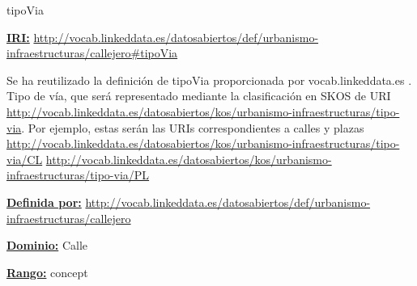 \begin{mybox}{tipoVia}
\begin{flushleft}
\underline{\textbf{IRI:}}
\url{http://vocab.linkeddata.es/datosabiertos/def/urbanismo-infraestructuras/callejero#tipoVia}
\newline

Se ha reutilizado la definición de tipoVia proporcionada por vocab.linkeddata.es \cite{datoabiertos_tipoVia}.
Tipo de vía, que será representado mediante la clasificación en SKOS de URI \url{http://vocab.linkeddata.es/datosabiertos/kos/urbanismo-infraestructuras/tipo-via}. Por ejemplo, estas serán las URIs correspondientes a calles y plazas \url{http://vocab.linkeddata.es/datosabiertos/kos/urbanismo-infraestructuras/tipo-via/CL} \url{http://vocab.linkeddata.es/datosabiertos/kos/urbanismo-infraestructuras/tipo-via/PL}
\newline

\underline{\textbf{Definida por:}}
\url{http://vocab.linkeddata.es/datosabiertos/def/urbanismo-infraestructuras/callejero}
\newline

\underline{\textbf{Dominio:}}
		Calle
\newline

\underline{\textbf{Rango:}}
		concept

\end{flushleft}
\end{mybox}























